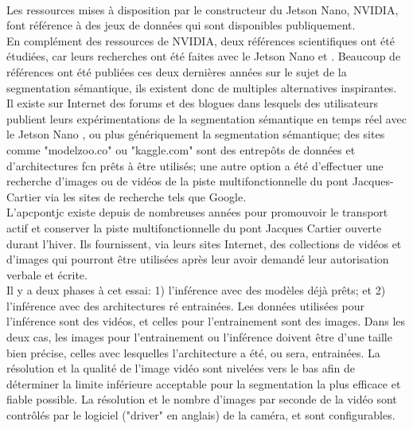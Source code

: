 ﻿\label{metho:data}
\vspace{\baselineskip}
\\
Les ressources mises à disposition par le constructeur du Jetson Nano, NVIDIA, font référence à des jeux de données qui sont disponibles publiquement.
\vspace{\baselineskip}
\\
\noindent En complément des ressources de NVIDIA, deux références scientifiques ont été étudiées, car leurs recherches ont été faites avec le Jetson Nano \parencite{nguyen_mavnet_2019} et \parencite{zheng_real-time_2020}. Beaucoup de références ont été publiées ces deux dernières années sur le sujet de la segmentation sémantique, ils existent donc de multiples alternatives inspirantes.
\vspace{\baselineskip}
\\
\noindent Il existe sur Internet des forums et des blogues dans lesquels des utilisateurs publient leurs expérimentations de la segmentation sémantique en temps réel avec le Jetson Nano \parencite{dustin_realtime_2019}, ou plus génériquement la segmentation sémantique; des sites comme "modelzoo.co" ou "kaggle.com" sont des entrepôts de données et d'architectures \acrshort{fcn} prêts à être utilisés; une autre option a été d'effectuer une recherche d'images ou de vidéos de la piste multifonctionnelle du pont Jacques-Cartier via les sites de recherche tels que Google. 
\vspace{\baselineskip}
\\
\noindent L'\acrlong{apcpontjc} existe depuis de nombreuses années pour promouvoir le transport actif et conserver la piste multifonctionnelle du pont Jacques Cartier ouverte durant l'hiver. Ils fournissent, via leurs sites Internet, des collections de vidéos et d'images qui pourront être utilisées après leur avoir demandé leur autorisation verbale et écrite. \parencite{association_des_pietons_et_cyclistes_du_pont_jacques-cartier_pontjacques-cartier365com_2020, association_des_pietons_et_cyclistes_pont_jacques-cartier_flickr_2020}
\vspace{\baselineskip}
\\
Il y a deux phases à cet essai: 1) l'inférence avec des modèles déjà prêts; et 2) l'inférence avec des architectures ré entrainées. Les données utilisées pour l'inférence sont des vidéos, et celles pour l'entrainement sont des images. Dans les deux cas, les images pour l'entrainement ou l'inférence doivent être d'une taille bien précise, celles avec lesquelles l'architecture a été, ou sera, entrainées. La résolution et la qualité de l'image vidéo sont nivelées vers le bas afin de déterminer la limite inférieure acceptable pour la segmentation la plus efficace et fiable possible. La résolution et le nombre d'images par seconde de la vidéo sont contrôlés par le logiciel ("driver" en anglais) de la caméra, et sont configurables. 
